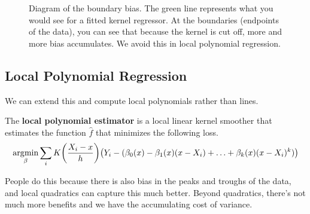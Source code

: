   \begin{figure}[H]
    \centering 
    \caption{Diagram of the boundary bias. The green line represents what you would see for a fitted kernel regressor. At the boundaries (endpoints of the data), you can see that because the kernel is cut off, more and more bias accumulates. We avoid this in local polynomial regression.} 
  \end{figure}

\subsection{Local Polynomial Regression}

  We can extend this and compute local polynomials rather than lines. 

  \begin{definition}
    The \textbf{local polynomial estimator} is a local linear kernel smoother that estimates the function $\hat{f}$ that minimizes the following loss. 
    \begin{equation}
      \argmin_{\beta} \sum_i K \bigg( \frac{X_i - x}{h} \bigg) \big( Y_i - (\beta_0 (x) - \beta_1 (x) (x- X_i) + \ldots + \beta_k (x) (x - X_i)^k )\big)
    \end{equation}
  \end{definition}

  People do this because there is also bias in the peaks and troughs of the data, and local quadratics can capture this much better. Beyond quadratics, there's not much more benefits and we have the accumulating cost of variance. 
